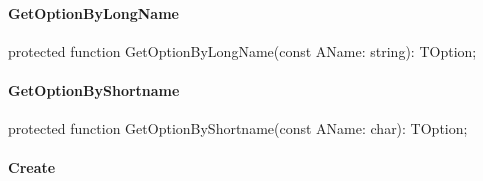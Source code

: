 \documentclass{report}
\newif\ifpdf
\begin{document}
\paragraph*{GetOptionByLongName}\hspace*{\fill}

\label{PasDoc_OptionParser.TOptionParser-GetOptionByLongName}
\begin{list}{}{
\setlength{\itemindent}{0cm}
\setlength{\listparindent}{0cm}
\setlength{\leftmargin}{\evensidemargin}
\addtolength{\leftmargin}{\tmplength}
\settowidth{\labelsep}{X}
\addtolength{\leftmargin}{\labelsep}
\setlength{\labelwidth}{\tmplength}
}
\item[\textbf{Declaration}\hfill]
\ifpdf
\begin{flushleft}
\fi
\begin{ttfamily}
protected function GetOptionByLongName(const AName: string): TOption;\end{ttfamily}

\ifpdf
\end{flushleft}
\fi

\end{list}
\paragraph*{GetOptionByShortname}\hspace*{\fill}

\label{PasDoc_OptionParser.TOptionParser-GetOptionByShortname}
\begin{list}{}{
\setlength{\itemindent}{0cm}
\setlength{\listparindent}{0cm}
\setlength{\leftmargin}{\evensidemargin}
\addtolength{\leftmargin}{\tmplength}
\settowidth{\labelsep}{X}
\addtolength{\leftmargin}{\labelsep}
\setlength{\labelwidth}{\tmplength}
}
\item[\textbf{Declaration}\hfill]
\ifpdf
\begin{flushleft}
\fi
\begin{ttfamily}
protected function GetOptionByShortname(const AName: char): TOption;\end{ttfamily}

\ifpdf
\end{flushleft}
\fi

\end{list}
\paragraph*{Create}\hspace*{\fill}
\end{document}
